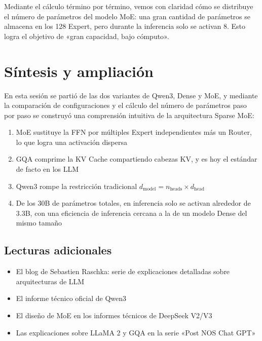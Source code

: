 \documentclass[a4paper]{article}
\begin{document}
Mediante el cálculo término por término, vemos con claridad cómo se distribuye el número de parámetros del modelo MoE: una gran cantidad de parámetros se almacena en los 128 Expert, pero durante la inferencia solo se activan 8. Esto logra el objetivo de «gran capacidad, bajo cómputo».

\section{Síntesis y ampliación}

En esta sesión se partió de las dos variantes de Qwen3, Dense y MoE, y mediante la comparación de configuraciones y el cálculo del número de parámetros paso por paso se construyó una comprensión intuitiva de la arquitectura Sparse MoE:

\begin{enumerate}
  \item MoE sustituye la FFN por múltiples Expert independientes más un Router, lo que logra una activación dispersa
  \item GQA comprime la KV Cache compartiendo cabezas KV, y es hoy el estándar de facto en los LLM
  \item Qwen3 rompe la restricción tradicional $d_{\text{model}} = n_{\text{heads}} \times d_{\text{head}}$
  \item De los 30B de parámetros totales, en inferencia solo se activan alrededor de 3.3B, con una eficiencia de inferencia cercana a la de un modelo Dense del mismo tamaño
\end{enumerate}

\subsection{Lecturas adicionales}

\begin{itemize}
  \item El blog de Sebastien Raschka: serie de explicaciones detalladas sobre arquitecturas de LLM
  \item El informe técnico oficial de Qwen3
  \item El diseño de MoE en los informes técnicos de DeepSeek V2/V3
  \item Las explicaciones sobre LLaMA 2 y GQA en la serie «Post NOS Chat GPT»
\end{itemize}

\end{document}
